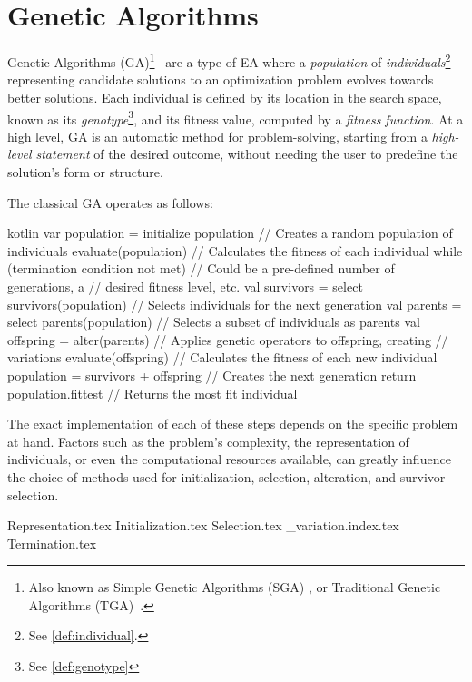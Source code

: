\section{Genetic Algorithms}
\label{sec:bg:ga}
  Genetic Algorithms (GA)\footnote{
    Also known as Simple Genetic Algorithms (SGA) 
    \autocite{yuIntroductionEvolutionaryAlgorithms2010}, or Traditional 
    Genetic Algorithms (TGA)~\autocite{shiffmanNatureCode2012}.
  }~\autocite{hollandAdaptationNaturalArtificial1992a,kozaGeneticProgrammingProgramming1992a,yuIntroductionEvolutionaryAlgorithms2010,shiffmanNatureCode2012}
  are a type of EA where a \emph{population} of \emph{individuals}\footnote{
    See \vref{def:individual}.
  } representing candidate solutions to an optimization problem evolves towards 
  better solutions.
  Each individual is defined by its location in the search space, known as its
  \emph{genotype}\footnote{See \vref{def:genotype}}, and its fitness value, 
  computed by a \emph{fitness function}.
  At a high level, GA is an automatic method for problem-solving, starting from
  a \textit{high-level statement} of the desired outcome, without needing the
  user to predefine the solution's form or structure.

  The classical GA operates as follows:

  \begin{code}{kotlin}
    var population = initialize population // Creates a random population of individuals
    evaluate(population) // Calculates the fitness of each individual
    while (termination condition not met) { // Could be a pre-defined number of generations, a 
                                            // desired fitness level, etc.
      val survivors = select survivors(population) // Selects individuals for the next generation
      val parents = select parents(population) // Selects a subset of individuals as parents
      val offspring = alter(parents)  // Applies genetic operators to offspring, creating 
                                      // variations
      evaluate(offspring) // Calculates the fitness of each new individual
      population = survivors + offspring // Creates the next generation
    }
    return population.fittest // Returns the most fit individual
  \end{code}

  The exact implementation of each of these steps depends on the specific 
  problem at hand.
  Factors such as the problem's complexity, the representation of individuals,
  or even the computational resources available, can greatly influence the
  choice of methods used for initialization, selection, alteration, and survivor
  selection.

  {Representation.tex}
  {Initialization.tex}
  {Selection.tex}
  {_variation.index.tex}
  {Termination.tex}
